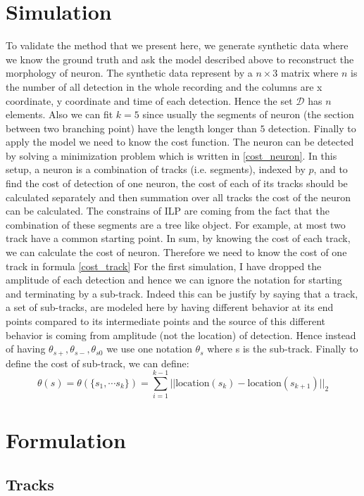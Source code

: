 \documentclass{article}
\begin{document}
\section{Simulation}
To validate the method that we present here, we generate synthetic data where we know the ground truth and ask the model described above to reconstruct the morphology of neuron. The synthetic data represent by a $n\times 3$ matrix where $n$ is the number of all detection in the whole recording and the columns are x coordinate, y coordinate and time of each detection. Hence the set $\mathcal{D}$  has $n$ elements. Also we can fit $k=5$ since usually the segments of neuron (the section between two branching point) have the length longer than $5$ detection. Finally to apply the model we need to know the cost function. The neuron can be detected by solving a minimization problem which is written in \ref{cost_neuron}. In this setup, a neuron is a combination of tracks (i.e. segments), indexed by $p$, and to find the cost of detection of one neuron, the cost of each of its tracks should be calculated separately and then summation over all tracks the cost of the neuron can be calculated. The constrains of ILP are coming from the fact that the combination of these segments are a tree like object. For example, at most two track have a common starting point. In sum, by knowing the cost of each track, we can calculate the cost of neuron. Therefore we need to know the cost of one track in formula \ref{cost_track} For the first simulation, I have dropped the amplitude of each detection and hence we can ignore the notation for starting and terminating by a sub-track. Indeed this can be justify by saying that a track, a set of sub-tracks, are modeled here by having different behavior at its end points compared to its intermediate points and the source of this different behavior is coming from amplitude (not the location) of detection. Hence instead of having $\theta_{s+}, \theta_{s-}, \theta_{s0}$ we use one notation $\theta_{s}$ where s is the sub-track.
Finally to define the cost of sub-track, we can define:
\begin{equation}
\theta (s) = \theta ( \{ s_1, \cdots s_k\} ) = \sum_{i=1}^{k-1} ||\text{location}(s_k) - \text{location}(s_{k+1}) ||_2
\end{equation}
\section{Formulation}
\subsection{Tracks }
\end{document}
